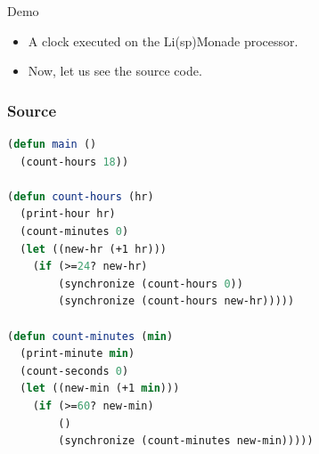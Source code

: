 \documentclass{beamer}
\begin{document}
\begin{frame}{Demo}
\begin{itemize}
\item A clock executed on the Li(sp)Monade processor.
\pause
\item Now, let us see the source code.
\end{itemize}
\end{frame}

\begin{frame}[fragile]
\frametitle{Source}
\begin{lstlisting}[language=Lisp,basicstyle=\scriptsize]
(defun main ()
  (count-hours 18))

(defun count-hours (hr)
  (print-hour hr) 
  (count-minutes 0)
  (let ((new-hr (+1 hr)))
    (if (>=24? new-hr)
        (synchronize (count-hours 0)) 
        (synchronize (count-hours new-hr)))))

(defun count-minutes (min)
  (print-minute min)
  (count-seconds 0)
  (let ((new-min (+1 min)))
    (if (>=60? new-min)
        ()  
        (synchronize (count-minutes new-min)))))
\end{lstlisting}

\end{frame}
\end{document}
